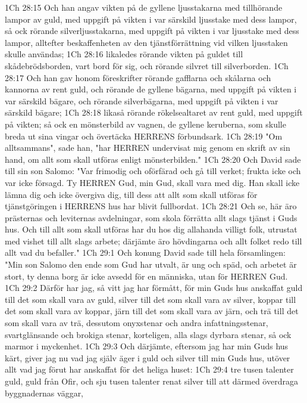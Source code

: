 1Ch 28:15  Och han angav vikten på de gyllene ljusstakarna med tillhörande lampor av guld, med uppgift på vikten i var särskild ljusstake med dess lampor, så ock rörande silverljusstakarna, med uppgift på vikten i var ljusstake med dess lampor, alltefter beskaffenheten av den tjänstförrättning vid vilken ljusstaken skulle användas;
1Ch 28:16  likaledes rörande vikten på guldet till skådebrödsborden, vart bord för sig, och rörande silvret till silverborden.
1Ch 28:17  Och han gav honom föreskrifter rörande gafflarna och skålarna och kannorna av rent guld, och rörande de gyllene bägarna, med uppgift på vikten i var särskild bägare, och rörande silverbägarna, med uppgift på vikten i var särskild bägare;
1Ch 28:18  likaså rörande rökelsealtaret av rent guld, med uppgift på vikten; så ock en mönsterbild av vagnen, de gyllene keruberna, som skulle breda ut sina vingar och övertäcka HERRENS förbundsark.
1Ch 28:19  "Om alltsammans", sade han, "har HERREN undervisat mig genom en skrift av sin hand, om allt som skall utföras enligt mönsterbilden."
1Ch 28:20  Och David sade till sin son Salomo: "Var frimodig och oförfärad och gå till verket; frukta icke och var icke försagd. Ty HERREN Gud, min Gud, skall vara med dig. Han skall icke lämna dig och icke övergiva dig, till dess att allt som skall utföras för tjänstgöringen i HERRENS hus har blivit fullbordat.
1Ch 28:21  Och se, här äro prästernas och leviternas avdelningar, som skola förrätta allt slags tjänst i Guds hus. Och till allt som skall utföras har du hos dig allahanda villigt folk, utrustat med vishet till allt slags arbete; därjämte äro hövdingarna och allt folket redo till allt vad du befaller."
1Ch 29:1  Och konung David sade till hela församlingen: "Min son Salomo den ende som Gud har utvalt, är ung och späd, och arbetet är stort, ty denna borg är icke avsedd för en människa, utan för HERREN Gud.
1Ch 29:2  Därför har jag, så vitt jag har förmått, för min Guds hus anskaffat guld till det som skall vara av guld, silver till det som skall vara av silver, koppar till det som skall vara av koppar, järn till det som skall vara av järn, och trä till det som skall vara av trä, dessutom onyxstenar och andra infattningsstenar, svartglänsande och brokiga stenar, korteligen, alla slags dyrbara stenar, så ock marmor i myckenhet.
1Ch 29:3  Och därjämte, eftersom jag har min Guds hus kärt, giver jag nu vad jag själv äger i guld och silver till min Guds hus, utöver allt vad jag förut har anskaffat för det heliga huset:
1Ch 29:4  tre tusen talenter guld, guld från Ofir, och sju tusen talenter renat silver till att därmed överdraga byggnadernas väggar,
